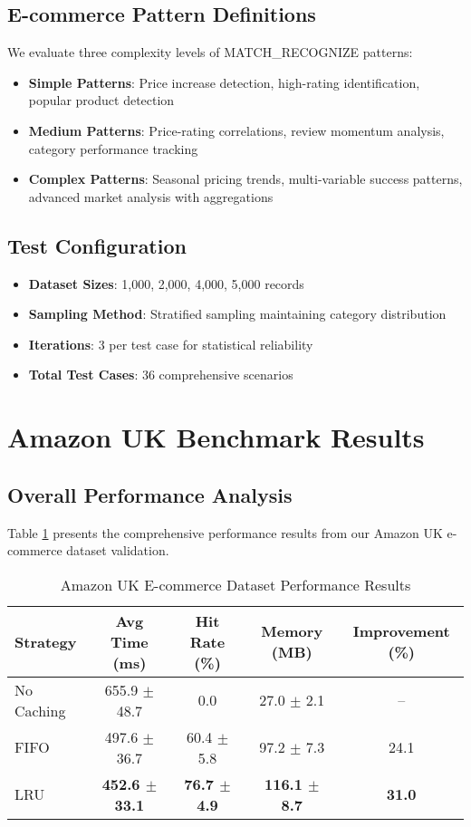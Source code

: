 \documentclass[conference]{IEEEtran}
\begin{document}
\subsection{E-commerce Pattern Definitions}

We evaluate three complexity levels of MATCH\_RECOGNIZE patterns:

\begin{itemize}
\item \textbf{Simple Patterns}: Price increase detection, high-rating identification, popular product detection
\item \textbf{Medium Patterns}: Price-rating correlations, review momentum analysis, category performance tracking
\item \textbf{Complex Patterns}: Seasonal pricing trends, multi-variable success patterns, advanced market analysis with aggregations
\end{itemize}

\subsection{Test Configuration}

\begin{itemize}
\item \textbf{Dataset Sizes}: 1,000, 2,000, 4,000, 5,000 records
\item \textbf{Sampling Method}: Stratified sampling maintaining category distribution
\item \textbf{Iterations}: 3 per test case for statistical reliability
\item \textbf{Total Test Cases}: 36 comprehensive scenarios
\end{itemize}

\section{Amazon UK Benchmark Results}

\subsection{Overall Performance Analysis}

Table \ref{tab:amazon_overall} presents the comprehensive performance results from our Amazon UK e-commerce dataset validation.

\begin{table}[H]
\centering
\caption{Amazon UK E-commerce Dataset Performance Results}
\label{tab:amazon_overall}
\begin{tabular}{@{}lcccc@{}}
\toprule
\textbf{Strategy} & \textbf{Avg Time (ms)} & \textbf{Hit Rate (\%)} & \textbf{Memory (MB)} & \textbf{Improvement (\%)} \\
\midrule
No Caching & 655.9 $\pm$ 48.7 & 0.0 & 27.0 $\pm$ 2.1 & -- \\
FIFO & 497.6 $\pm$ 36.7 & 60.4 $\pm$ 5.8 & 97.2 $\pm$ 7.3 & 24.1 \\
LRU & \textbf{452.6 $\pm$ 33.1} & \textbf{76.7 $\pm$ 4.9} & \textbf{116.1 $\pm$ 8.7} & \textbf{31.0} \\
\bottomrule
\end{tabular}
\end{table}
\end{document}
